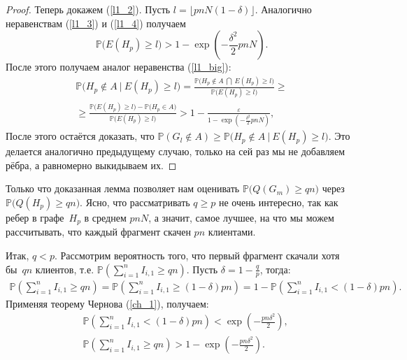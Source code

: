 \documentclass{matmex-diploma-custom}
\newcommand{\PRob}{\mathbb P}
\newcommand{\geqs}{\geqslant}
\newcommand{\eps}{\varepsilon}
\theoremstyle{named}
\begin{document}
\begin{proof}
Теперь докажем (\ref{l1_2}). Пусть $l = \lfloor pnN(1-\delta) \rfloor$. Аналогично неравенствам (\ref{l1_3}) и (\ref{l1_4}) получаем
\begin{equation} \label{l1_5}
\PRob\big( E(H_p) \geqs l \big) > 1 - \exp\left(-\frac{\delta^2}{2}pnN\right).
\end{equation}
После этого получаем аналог неравенства (\ref{l1_big}):
\begin{equation}\label{l1_big2}
\begin{aligned}
	\PRob\Big( H_p \not\in A~\big|~E(H_p) \geqs l \Big)
=
	\frac{
		\PRob\Big( H_p \not\in A~\bigcap~E(H_p) \geqs l \Big)
	}{
		\PRob\big(E(H_p) \geqs l \big)
	} 
\geqs
\\
\geqs
	\frac{
		\PRob\big(E(H_p) \geqs l \big) 
			-
		\PRob\big(H_p \in A \big)
	}{
		\PRob\big(E(H_p) \geqs l\big)
	}
>
	1
		-
	\frac{\eps}{
		1 - \exp\left(-\frac{\delta^2}{2}pnN\right)
	},
\end{aligned}\end{equation}
После этого остаётся доказать, что $\PRob(G_l \not\in A) \geqs \PRob\Big( H_p \not\in A~\big|~ E(H_p) \geqs l \Big)$.
Это делается аналогично предыдущему случаю, только на сей раз мы не добавляем рёбра, а равномерно выкидываем их.
\end{proof}

\bigskip

Только что доказанная лемма позволяет нам оценивать $\PRob\big(Q(G_m) \geqs qn\big)$ через $\PRob\big(Q(H_p) \geqs q n\big)$.
Ясно, что рассматривать $q \geqs p$ не очень интересно, так как ребер в графе~$H_p$ в среднем $p nN$, 
а значит, самое лучшее, на что мы можем рассчитывать, что каждый фрагмент скачен $p  n$ клиентами.

Итак, $q < p$. Рассмотрим вероятность того, что первый фрагмент скачали хотя бы~$qn$ клиентов, 
т.е. $\PRob\left(\sum\limits_{i=1}^n I_{i,1} \geqs qn\right)$. Пусть $\delta = 1 - \frac{q}{p}$, тогда:
\begin{align*}
\PRob\left(\sum_{i=1}^n I_{i,1} \geqs qn\right) = \PRob\left(\sum_{i=1}^n I_{i,1} \geqs (1 - \delta) pn\right) 
= 1 - \PRob\left(\sum_{i=1}^n I_{i,1} < (1 - \delta) pn\right).
\end{align*}
Применяя теорему Чернова (\ref{ch_1}), получаем:
\begin{align}
&\PRob\left(\sum_{i=1}^n I_{i,1} < (1 - \delta) pn\right) < \exp\left(- \frac{pn \delta^2}{2} \right),
\\
&\PRob\left(\sum_{i=1}^n I_{i,1} \geqs qn\right) > 1 - \exp\left(- \frac{pn \delta^2}{2} \right).
\end{align}
\end{document}
